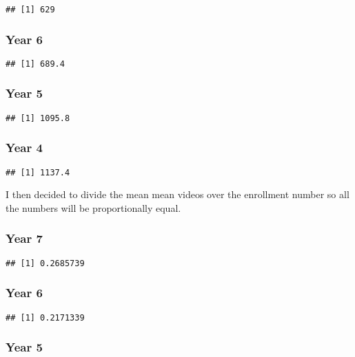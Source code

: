 \documentclass[
]{article}
\begin{document}
\begin{verbatim}
## [1] 629
\end{verbatim}

\hypertarget{year-6-2}{%
\subsubsection{Year 6}\label{year-6-2}}

\begin{verbatim}
## [1] 689.4
\end{verbatim}

\hypertarget{year-5-2}{%
\subsubsection{Year 5}\label{year-5-2}}

\begin{verbatim}
## [1] 1095.8
\end{verbatim}

\hypertarget{year-4-2}{%
\subsubsection{Year 4}\label{year-4-2}}

\begin{verbatim}
## [1] 1137.4
\end{verbatim}

I then decided to divide the mean mean videos over the enrollment number
so all the numbers will be proportionally equal.

\hypertarget{year-7-3}{%
\subsubsection{Year 7}\label{year-7-3}}

\begin{verbatim}
## [1] 0.2685739
\end{verbatim}

\hypertarget{year-6-3}{%
\subsubsection{Year 6}\label{year-6-3}}

\begin{verbatim}
## [1] 0.2171339
\end{verbatim}

\hypertarget{year-5-3}{%
\subsubsection{Year 5}\label{year-5-3}}
\end{document}
